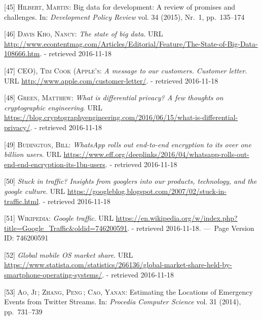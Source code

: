 \documentclass[12pt,english,a4paper,titlepage,cleardoublepage=empty,dottedtoc]{report}
\begin{document}
\hypertarget{ref-paper_2015_big-data-for-development-a-review-of-promises-and-challenges:more-data}{}
{[}45{]} \textsc{Hilbert, Martin}: Big data for development: A review of
promises and challenges. In: \emph{Development Policy Review} vol. 34
(2015), Nr.~1, pp.~135--174

\hypertarget{ref-web_2016_the-state-of-big-data}{}
{[}46{]} \textsc{Davis Kho, Nancy}: \emph{The state of big data}. URL
\url{http://www.econtentmag.com/Articles/Editorial/Feature/The-State-of-Big-Data-108666.htm}.
- retrieved 2016-11-18

\hypertarget{ref-web_2016_apple_customer-letter}{}
{[}47{]} \textsc{CEO), Tim Cook (Apple's}: \emph{A message to our
customers. Customer letter}. URL
\url{http://www.apple.com/customer-letter/}. - retrieved 2016-11-18

\hypertarget{ref-web_2016_what-is-differential-privacy}{}
{[}48{]} \textsc{Green, Matthew}: \emph{What is differential privacy? A
few thoughts on cryptographic engineering}. URL
\url{https://blog.cryptographyengineering.com/2016/06/15/what-is-differential-privacy/}.
- retrieved 2016-11-18

\hypertarget{ref-web_2016_eff_whatsapp-rolls-out-emd-to-end-encryption}{}
{[}49{]} \textsc{Budington, Bill}: \emph{WhatsApp rolls out end-to-end
encryption to its over one billion users}. URL
\url{https://www.eff.org/deeplinks/2016/04/whatsapp-rolls-out-end-end-encryption-its-1bn-users}.
- retrieved 2016-11-18

\hypertarget{ref-web_2007_introducing-google-traffic}{}
{[}50{]} \emph{Stuck in traffic? Insights from googlers into our
products, technology, and the google culture}. URL
\url{https://googleblog.blogspot.com/2007/02/stuck-in-traffic.html}. -
retrieved 2016-11-18

\hypertarget{ref-web_2016_wikipedia_google-traffic}{}
{[}51{]} \textsc{Wikipedia}: \emph{Google traffic}. URL
\url{https://en.wikipedia.org/w/index.php?title=Google_Traffic\&oldid=746200591}.
- retrieved 2016-11-18. ---~Page Version ID: 746200591

\hypertarget{ref-graphic_2016_global-mobile-os-market-share}{}
{[}52{]} \emph{Global mobile OS market share}. URL
\url{https://www.statista.com/statistics/266136/global-market-share-held-by-smartphone-operating-systems/}.
- retrieved 2016-11-18

\hypertarget{ref-estimating-the-locations-of-emergency-events-from-twitter-streams_2014}{}
{[}53{]} \textsc{Ao, Ji}\,; \textsc{Zhang, Peng}\,; \textsc{Cao, Yanan}:
Estimating the Locations of Emergency Events from Twitter Streams. In:
\emph{Procedia Computer Science} vol. 31 (2014), pp.~731--739
\end{document}
